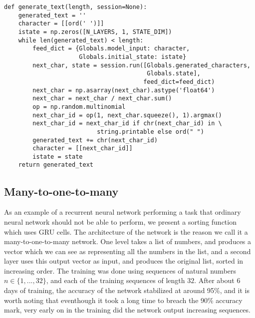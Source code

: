 \documentclass[10pt]{amsart}
\theoremstyle{definition}
\begin{document}
\begin{verbatim}
def generate_text(length, session=None):
    generated_text = ''
    character = [[ord(' ')]]
    istate = np.zeros([N_LAYERS, 1, STATE_DIM])
    while len(generated_text) < length:
        feed_dict = {Globals.model_input: character,
                     Globals.initial_state: istate}
        next_char, state = session.run([Globals.generated_characters,
                                        Globals.state],
                                       feed_dict=feed_dict)
        next_char = np.asarray(next_char).astype('float64')
        next_char = next_char / next_char.sum()
        op = np.random.multinomial
        next_char_id = op(1, next_char.squeeze(), 1).argmax()
        next_char_id = next_char_id if chr(next_char_id) in \
                          string.printable else ord(" ")
        generated_text += chr(next_char_id)
        character = [[next_char_id]]
        istate = state
    return generated_text
\end{verbatim}

\subsection{Many-to-one-to-many}

As an example of a recurrent neural network performing a task that ordinary neural network
should not be able to perform, we present a sorting function which uses GRU cells. The architecture
of the network is the reason we call it a many-to-one-to-many network.  One level takes a list
of numbers, and produces a vector which we can see as representing all the numbers in the list,
and a second layer uses this output vector as input, and produces the original list, sorted in
increasing order. The training was done using sequences of natural numbers $n\in\{1,...,32\}$, and each
of the training sequences of length $32$.  After about 6 days of training, the accuracy of the network
stabilized at around 95\%, and it is worth noting that eventhough it took a long time to breach
the 90\% accuracy mark, very early on in the training did the network output increasing sequences.
\end{document}
